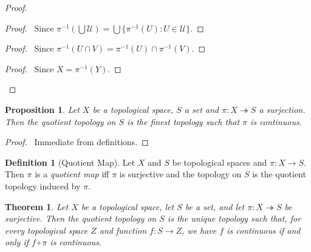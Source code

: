 \documentclass{book}
\let\qed\relax
\newtheorem{prop}[ax]{Proposition}
\newtheorem{thm}[ax]{Theorem}
\theoremstyle{definition}
\newtheorem{df}[ax]{Definition}
\newcommand{\inv}[1]{\ensuremath{{#1}^{-1}}}
\begin{document}
\begin{proof}
\pf
{}
\begin{proof}
	\pf\ Since $\inv{\pi}(\bigcup \mathcal{U}) = \bigcup \{ \inv{\pi}(U) : U \in \mathcal{U} \}$.
\end{proof}
\begin{proof}
	\pf\ Since $\inv{\pi}(U \cap V) = \inv{\pi}(U) \cap \inv{\pi}(V)$.
\end{proof}
\begin{proof}
	\pf\ Since $X = \inv{\pi}(Y)$.
\end{proof}
\qed
\end{proof}

\begin{prop}
Let $X$ be a topological space, $S$ a set and $\pi : X \twoheadrightarrow S$ a surjection. Then the quotient topology on $S$ is the finest topology such that $\pi$ is continuous.
\end{prop}

\begin{proof}
\pf\ Immediate from definitions. \qed
\end{proof}

\begin{df}[Quotient Map]
Let $X$ and $S$ be topological spaces and $\pi : X \rightarrow S$. Then $\pi$ is a \emph{quotient map} iff $\pi$ is surjective and the topology on $S$ is the quotient topology induced by $\pi$.
\end{df}

\begin{thm}
Let $X$ be a topological space, let $S$ be a set, and let $\pi : X \twoheadrightarrow S$ be surjective. Then the quotient topology on $S$ is the unique topology such that, for every topological space $Z$ and function $f : S \rightarrow Z$, we have $f$ is continuous if and only if $f \circ \pi$ is continuous.
\end{thm}
\end{document}
